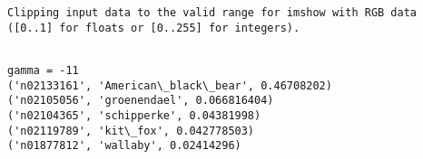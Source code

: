 \documentclass[11pt]{article}
\begin{document}
    \begin{Verbatim}[commandchars=\\\{\}]
Clipping input data to the valid range for imshow with RGB data ([0..1] for floats or [0..255] for integers).

    \end{Verbatim}

    \begin{Verbatim}[commandchars=\\\{\}]

gamma = -11
('n02133161', 'American\_black\_bear', 0.46708202)
('n02105056', 'groenendael', 0.066816404)
('n02104365', 'schipperke', 0.04381998)
('n02119789', 'kit\_fox', 0.042778503)
('n01877812', 'wallaby', 0.02414296)

    \end{Verbatim}
\end{document}

